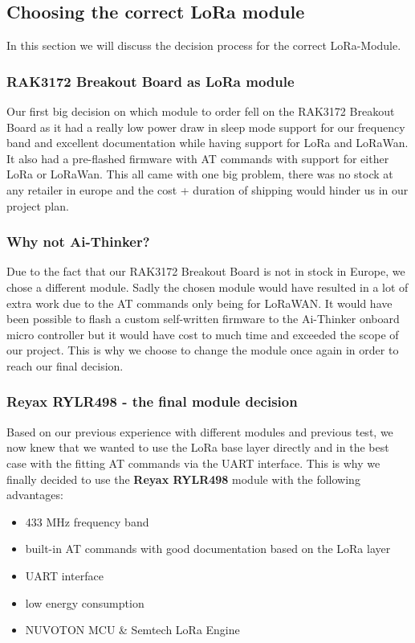\subsection{Choosing the correct LoRa module}

In this section we will discuss the decision process for the correct LoRa-Module.

\subsubsection{RAK3172 Breakout Board as LoRa module}
Our first big decision on which module to order fell on the RAK3172 Breakout Board as it had a really low power draw in sleep mode support for our frequency band and excellent documentation while having support for LoRa and LoRaWan. It also had a pre-flashed firmware with AT commands with support for either LoRa or LoRaWan. This all came with one big problem, there was no stock at any retailer in europe and the cost + duration of shipping would hinder us in our project plan. 

\subsubsection{Why not Ai-Thinker?}
Due to the fact that our RAK3172 Breakout Board is not in stock in Europe, we chose a different module. Sadly the chosen module would have resulted in a lot of extra work due to the AT commands only being for LoRaWAN. It would have been possible to flash a custom self-written firmware to the Ai-Thinker onboard micro controller but it would have cost to much time and exceeded the scope of our project. This is why we choose to change the module once again in order to reach our final decision. 

\subsubsection{Reyax RYLR498 - the final module decision}
Based on our previous experience with different modules and previous test, we now knew that we wanted to use the LoRa base layer directly and in the best case with the fitting AT commands via the UART interface. This is why we finally decided to use the \textbf{Reyax RYLR498} module with the following advantages:

\begin{itemize}
    \item 433 MHz frequency band
    \item built-in AT commands with good documentation based on the LoRa layer
    \item UART interface
    \item low energy consumption
    \item NUVOTON MCU \& Semtech LoRa Engine
\end{itemize}

